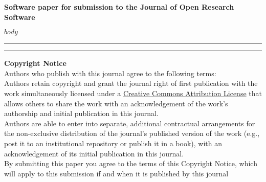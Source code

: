 \documentclass{jors}
\begin{document}
{\bf Software paper for submission to the Journal of Open Research Software}

$body$

\vspace{2cm}

\rule{\textwidth}{1pt}





\vspace{2cm}

\rule{\textwidth}{1pt}

{ \bf Copyright Notice} \\
Authors who publish with this journal agree to the following terms: \\

Authors retain copyright and grant the journal right of first publication with the work simultaneously licensed under a  \href{http://creativecommons.org/licenses/by/3.0/}{Creative Commons Attribution License} that allows others to share the work with an acknowledgement of the work's authorship and initial publication in this journal. \\

Authors are able to enter into separate, additional contractual arrangements for the non-exclusive distribution of the journal's published version of the work (e.g., post it to an institutional repository or publish it in a book), with an acknowledgement of its initial publication in this journal. \\

By submitting this paper you agree to the terms of this Copyright Notice, which will apply to this submission if and when it is published by this journal
\end{document}
